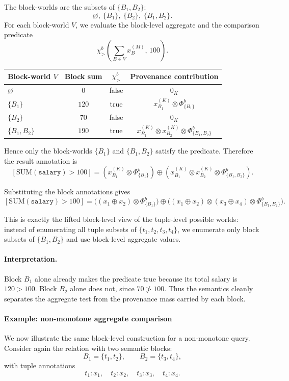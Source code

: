 \documentclass[10pt,a4paper]{scrartcl}
\theoremstyle{definition}
\theoremstyle{remark}
\begin{document}
The block-worlds are the subsets of $\{B_1,B_2\}$:
\[
\varnothing,\ \{B_1\},\ \{B_2\},\ \{B_1,B_2\}.
\]
For each block-world $V$, we evaluate the block-level aggregate and the comparison predicate
\[
\chi^b_{>}\!\left(\sum_{B\in V} x_B^{(M)},\,100\right).
\]

\begin{center}
\begin{tabular}{>{\raggedright\arraybackslash}p{3cm}ccc}
\toprule
Block-world $V$ & Block sum & $\chi^b_{>}$ & Provenance contribution \\
\midrule
$\varnothing$ & $0$   & false & $0_K$ \\
$\{B_1\}$     & $120$ & true  & $x^{(K)}_{B_1}\otimes \Phi^b_{\{B_1\}}$ \\
$\{B_2\}$     & $70$  & false & $0_K$ \\
$\{B_1,B_2\}$ & $190$ & true  & $x^{(K)}_{B_1}\otimes x^{(K)}_{B_2}\otimes \Phi^b_{\{B_1,B_2\}}$ \\
\bottomrule
\end{tabular}
\end{center}

Hence only the block-worlds $\{B_1\}$ and $\{B_1,B_2\}$ satisfy the predicate. Therefore the result annotation is
\[
[\mathrm{SUM}(\texttt{salary}) > 100]
=
\left(x^{(K)}_{B_1}\otimes \Phi^b_{\{B_1\}}\right)
\oplus
\left(x^{(K)}_{B_1}\otimes x^{(K)}_{B_2}\otimes \Phi^b_{\{B_1,B_2\}}\right).
\]

Substituting the block annotations gives
\[
[\mathrm{SUM}(\texttt{salary}) > 100]
=
\bigl((x_1\oplus x_2)\otimes \Phi^b_{\{B_1\}}\bigr)
\oplus
\bigl((x_1\oplus x_2)\otimes (x_3\oplus x_4)\otimes \Phi^b_{\{B_1,B_2\}}\bigr).
\]

This is exactly the lifted block-level view of the tuple-level possible worlds: instead of enumerating all tuple subsets of
$\{t_1,t_2,t_3,t_4\}$, we enumerate only block subsets of $\{B_1,B_2\}$ and use block-level aggregate values.

\paragraph{Interpretation.}
Block $B_1$ alone already makes the predicate true because its total salary is $120>100$.
Block $B_2$ alone does not, since $70 \not> 100$.
Thus the semantics cleanly separates the aggregate test from the provenance mass carried by each block.

\paragraph{Example: non-monotone aggregate comparison}
We now illustrate the same block-level construction for 
a non-monotone query.
Consider again the relation with two semantic blocks:
\[
B_1=\{t_1,t_2\}, \qquad B_2=\{t_3,t_4\},
\]
with tuple annotations
\[
t_1:x_1,\quad t_2:x_2,\quad t_3:x_3,\quad t_4:x_4.
\]
\end{document}

